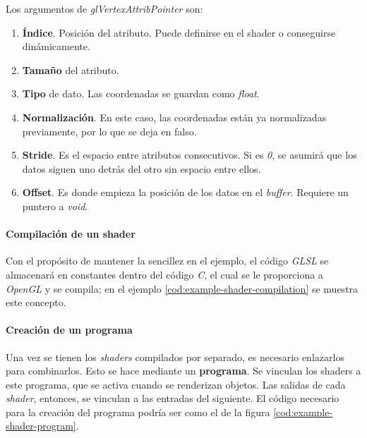 Los argumentos de \textit{glVertexAttribPointer} son:
\begin{enumerate}
    \item \textbf{Índice}. Posición del atributo. Puede definirse en el shader o conseguirse dinámicamente.

    \item \textbf{Tamaño} del atributo. 

    \item \textbf{Tipo} de dato. Las coordenadas se guardan como \textit{float}.

    \item \textbf{Normalización}. En este caso, las coordenadas están ya normalizadas previamente, por lo que se deja en falso.

    \item \textbf{Stride}. Es el espacio entre atributos consecutivos. Si es \textit{0}, se asumirá que los datos siguen uno detrás del otro sin espacio entre ellos.

    \item \textbf{Offset}. Es donde empieza la posición de los datos en el \textit{buffer}. Requiere un puntero a \textit{void}.

\end{enumerate}

\FloatBarrier
\paragraph{Compilación de un shader} \label{par:ogl-shader-compilation}

Con el propósito de mantener la sencillez en el ejemplo, el código \textit{GLSL} se almacenará en constantes dentro del código \textit{C}, el cual se le proporciona a \textit{OpenGL} y se compila; en el ejemplo \ref{cod:example-shader-compilation} se muestra este concepto.



\FloatBarrier
\paragraph{Creación de un programa} \label{par:ogl-program-creation}

Una vez se tienen los \textit{shaders} compilados por separado, es necesario enlazarlos para combinarlos. Esto se hace mediante un \textbf{programa}. Se vinculan los shaders a este programa, que se activa cuando se renderizan objetos. Las salidas de cada \textit{shader}, entonces, se vinculan a las entradas del siguiente. El código necesario para la creación del programa podría ser como el de la figura \ref{cod:example-shader-program}.

